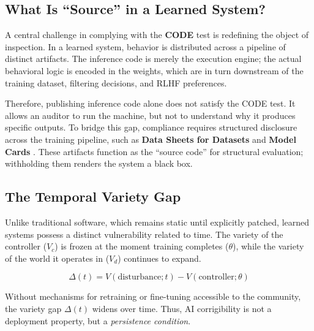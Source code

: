 \documentclass{article}
\begin{document}
\subsection{What Is ``Source'' in a Learned System?}

A central challenge in complying with the \textbf{CODE} test is redefining the object of inspection. In a learned system, behavior is distributed across a pipeline of distinct artifacts. The inference code is merely the execution engine; the actual behavioral logic is encoded in the weights, which are in turn downstream of the training dataset, filtering decisions, and RLHF preferences.

Therefore, publishing inference code alone does not satisfy the CODE test. It allows an auditor to run the machine, but not to understand why it produces specific outputs. To bridge this gap, compliance requires structured disclosure across the training pipeline, such as \textbf{Data Sheets for Datasets} \citep{gebru2021} and \textbf{Model Cards} \citep{mitchell2019}. These artifacts function as the ``source code'' for structural evaluation; withholding them renders the system a black box.

\subsection{The Temporal Variety Gap}

Unlike traditional software, which remains static until explicitly patched, learned systems possess a distinct vulnerability related to time. The variety of the controller ($V_c$) is frozen at the moment training completes ($\theta$), while the variety of the world it operates in ($V_d$) continues to expand.

\begin{equation}
\Delta(t) = V(\text{disturbance}; t) - V(\text{controller}; \theta)
\end{equation}

Without mechanisms for retraining or fine-tuning accessible to the community, the variety gap $\Delta(t)$ widens over time. Thus, AI corrigibility is not a deployment property, but a \textit{persistence condition}.
\end{document}
